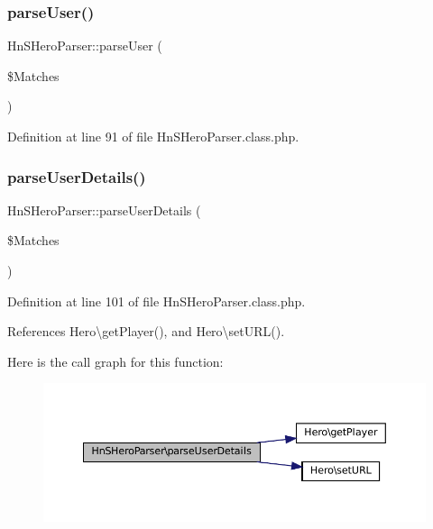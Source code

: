 \mbox{\label{class_hn_s_hero_parser_a9cf003b816c6cec46334bce6acb2ee34}} 
\subsubsection{\texorpdfstring{parse\+User()}{parseUser()}}
{\footnotesize\ttfamily Hn\+S\+Hero\+Parser\+::parse\+User (\begin{DoxyParamCaption}\item[{}]{\$\+Matches }\end{DoxyParamCaption})\hspace{0.3cm}{\ttfamily [protected]}}



Definition at line 91 of file Hn\+S\+Hero\+Parser.\+class.\+php.

\mbox{\label{class_hn_s_hero_parser_a01475115beae31cb18668710cca48144}} 
\subsubsection{\texorpdfstring{parse\+User\+Details()}{parseUserDetails()}}
{\footnotesize\ttfamily Hn\+S\+Hero\+Parser\+::parse\+User\+Details (\begin{DoxyParamCaption}\item[{}]{\$\+Matches }\end{DoxyParamCaption})\hspace{0.3cm}{\ttfamily [protected]}}



Definition at line 101 of file Hn\+S\+Hero\+Parser.\+class.\+php.



References Hero\textbackslash{}get\+Player(), and Hero\textbackslash{}set\+U\+R\+L().

Here is the call graph for this function\+:\nopagebreak
\begin{figure}[H]
\begin{center}
\leavevmode
\includegraphics[width=350pt]{class_hn_s_hero_parser_a01475115beae31cb18668710cca48144_cgraph}
\end{center}
\end{figure}


